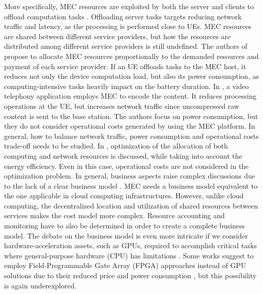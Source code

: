 More specifically, MEC resources are exploited by both the server and clients to offload computation tasks \cite{Ndikumana2017, Beck2015}.
Offloading server tasks targets reducing network traffic and latency, as the processing is performed close to UEs. MEC resources are shared between different service providers, but how the resources are distributed among different service providers is still undefined. The authors of \cite{Ndikumana2017} propose to allocate MEC resources proportionally to the demanded resources and payment of each service provider.
If an UE offloads tasks to the MEC host, it reduces not only the device computation load, but also its power consumption, as computing-intensive tasks heavily impact on the battery duration. In \cite{Beck2015}, a video telephony application employs MEC to encode the content. It reduces processing operations at the UE, but increases network traffic since uncompressed raw content is sent to the base station. The authors focus on power consumption, but they do not consider operational costs generated by using the MEC platform.
In general, how to balance network traffic, power consumption and operational costs trade-off needs to be studied. In \cite{Sun2020}, optimization of the allocation of both computing and network resources is discussed, while taking into account the energy efficiency. Even in this case, operational costs are not considered in the optimization problem. In general, business aspects
raise complex discussions
due to the lack of a clear business model \cite{Ahmed2017}. MEC needs a business model equivalent to the one applicable in cloud computing infrastructures. However, unlike cloud computing, the decentralized location and utilization of shared resources between services makes the cost model more complex. Resource accounting and monitoring have to also be determined in order to create a complete business model. The debate on the business model is even more intricate if we consider hardware-acceleration assets, such as GPUs, required to accomplish critical tasks where general-purpose hardware (CPU) has limitations \cite{Liu2019}. Some works suggest to employ Field-Programmable Gate Array (FPGA) approaches instead of GPU solutions due to their reduced price and power consumption \cite{Biookaghazadeh2018, Colbert2021}, but this possibility is again underexplored.


